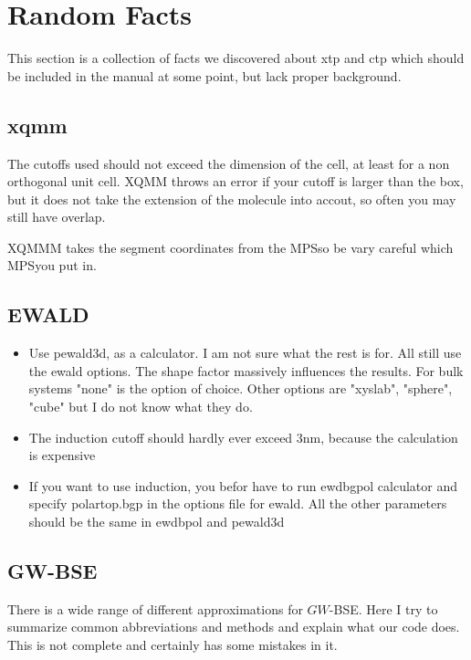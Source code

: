 \section{Random Facts}

This section is a collection of facts we discovered about xtp and ctp which should be included in the manual at some point, but lack proper background.



\subsection{xqmm}

The cutoffs used should not exceed the dimension of the cell, at least for a non orthogonal unit cell. XQMM throws an error if your cutoff is larger than the box, but it does not take the extension of the molecule into accout, so often you may still have overlap.

XQMMM takes the segment coordinates from the MPS\textunderscoreFiles so be vary careful which MPS\textunderscoreFile you put in.


\subsection{EWALD}


\begin{itemize}
\item Use pewald3d, as a calculator. I am not sure what the rest is for. All still use the ewald options. The shape factor massively influences the results. For bulk systems "none" is the option of choice. Other options are "xyslab", "sphere", "cube" but I do not know what they do.
\item The induction cutoff should hardly ever exceed 3nm, because the calculation is expensive
\item If you want to use induction, you befor have to run ewdbgpol calculator and specify polar\textunderscore top.bgp in the options file for ewald. All the other parameters should be the same in ewdbpol and pewald3d
\end{itemize}

\subsection{GW-BSE}

There is a wide range of different approximations for $GW$-BSE. Here I try to summarize common abbreviations and methods and explain what our code does. This is not complete and certainly has some mistakes in it. 




